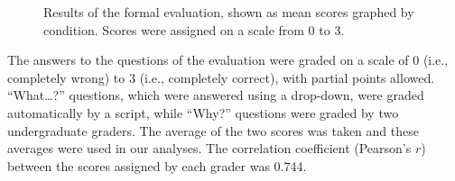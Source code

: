 \begin{figure}
\centering


	\caption[Results of the formal evaluation, shown as mean scores graphed by condition]{Results of the formal evaluation, shown as mean scores graphed by condition.  Scores were assigned on a scale from 0 to 3.}
	\label{fig:results}
\end{figure}

The answers to the questions of the evaluation were graded on a scale of 0 (i.e., completely wrong) to 3 (i.e., completely correct), with partial points allowed.  ``What\ldots?'' questions, which were answered using a drop-down, were graded automatically by a script, while ``Why?'' questions were graded by two undergraduate graders.  The average of the two scores was taken and these averages were used in our analyses.  The correlation coefficient (Pearson's $r$) between the scores assigned by each grader was 0.744.

